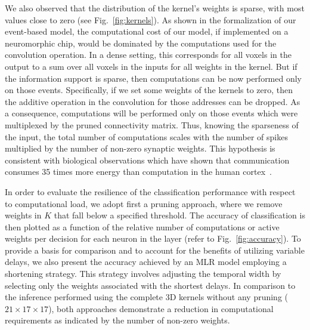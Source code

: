\documentclass[default]{sn-jnl}%
\theoremstyle{thmstyleone}%
\theoremstyle{thmstyletwo}%
\theoremstyle{thmstylethree}%
\newcommand{\seeFig}[1]{see Fig.~\ref{fig:#1}}%
\newcommand{\kernel}{K} %
\begin{document}
We also observed that the distribution of the kernel's weights is sparse, with most values close to zero (\seeFig{kernels}). As shown in the formalization of our event-based model, the computational cost of our model, if implemented on a neuromorphic chip, would be dominated by the computations used for the convolution operation. In a dense setting, this corresponds for all voxels in the output to a sum over all voxels in the inputs for all weights in the kernel. But if the information support is sparse, then computations can be now performed only on those events. Specifically, if we set some weights of the kernels to zero, then the additive operation in the convolution for those addresses can be dropped. As a consequence, computations will be performed only on those events which were multiplexed by the pruned connectivity matrix. Thus, knowing the sparseness of the input, the total number of computations scales with the number of spikes multiplied by the number of non-zero synaptic weights. This hypothesis is consistent with biological observations which have shown that communication consumes 35 times more energy than computation in the human cortex~\citep{Levy2021}.

In order to evaluate the resilience of the classification performance with respect to computational load, we adopt first a pruning approach, where we remove weights in $\kernel$ that fall below a specified threshold. The accuracy of classification is then plotted as a function of the relative number of computations or active weights per decision for each neuron in the layer (refer to Fig.~\ref{fig:accuracy}). To provide a basis for comparison and to account for the benefits of utilizing variable delays, we also present the accuracy achieved by an MLR model employing a shortening strategy. This strategy involves adjusting the temporal width by selecting only the weights associated with the shortest delays. In comparison to the inference performed using the complete 3D kernels without any pruning ($21\times17\times17$), both approaches demonstrate a reduction in computational requirements as indicated by the number of non-zero weights.
\end{document}
